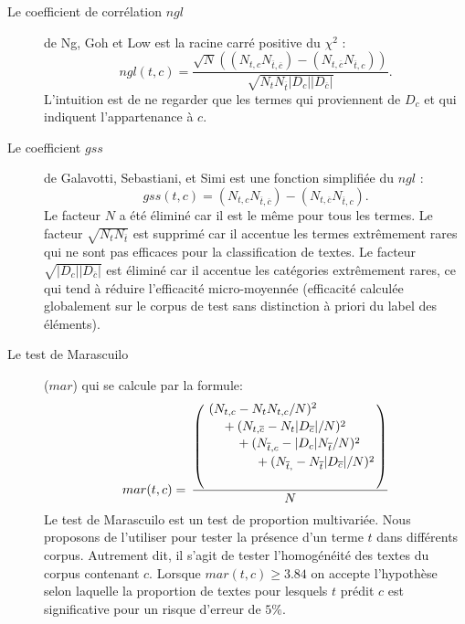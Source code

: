 \begin{description}
	\item[Le coefficient de corrélation $ngl$] de Ng, Goh et Low \citep{ng1997ngl} est la racine carré positive du $\chi^2$ \citep{schutze1995chi2}:
	\[ngl(t,c) = \frac{\sqrt{N} ((N_{t,c} N_{\overline{t},\overline{c}}) - (N_{t,\overline{c}} N_{\overline{t},c}))}{\sqrt{N_t N_{\overline{t}} \vert D_c \vert  \vert D_{\overline{c}} \vert }}.\]
	L'intuition est de ne regarder que les termes qui proviennent de $D_c$ et qui indiquent l'appartenance à $c$.
	\item[Le coefficient $gss$] de Galavotti, Sebastiani, et Simi
	 \citep{galavotti2000gss} est une fonction simplifiée du $ngl$ \citep{ng1997ngl} :
	\[gss(t,c) = (N_{t,c} N_{\overline{t},\overline{c}}) -  (N_{t,\overline{c}} N_{\overline{t},c}).\]
   Le facteur $N$ a été éliminé car il est le même pour tous les termes. Le facteur $\sqrt{N_tN_{\overline{t}}}$ est supprimé car il accentue les termes extrêmement rares qui ne sont pas efficaces pour la classification de textes. Le facteur  $\sqrt{\vert D_c \vert \vert D_{\overline{c}} \vert}$ est éliminé car il accentue les catégories extrêmement rares, ce qui tend à réduire l'efficacité micro-moyennée (efficacité calculée globalement sur le corpus de test sans distinction à priori du label des éléments).
   \item[Le test de Marascuilo] ($mar$) qui se calcule par la formule:
    \begin{equation*} mar(t, c) =  
    \,
    \dfrac{\left(
    	\splitdfrac{\splitdfrac{\splitdfrac{(N_{t,c} - N_{t}N_{t,c}/N)^2}{+ (N_{t,\overline{c}} - N_{t} \vert D_{\overline{c}} \vert /N)^2}}{+ (N_{\overline{t},c} - \vert D_c \vert N_{\overline{t}}/N)^2}}{+ (N_{\overline{t},\overline{}} - N_{\overline{t}} \vert D_{\overline{c}} \vert /N)^2}\right)}{N}
    \end{equation*}
    Le test de Marascuilo est un test de proportion multivariée. Nous proposons de l'utiliser pour tester la présence d'un terme $t$ dans différents corpus. Autrement dit, il s'agit de tester l'homogénéité des textes du corpus contenant $c$. Lorsque $ mar(t, c) \geq 3.84$ on accepte l'hypothèse selon laquelle la proportion de textes pour lesquels $t$ prédit $c$ est significative pour un risque d'erreur de $5\%$.

\end{description}
